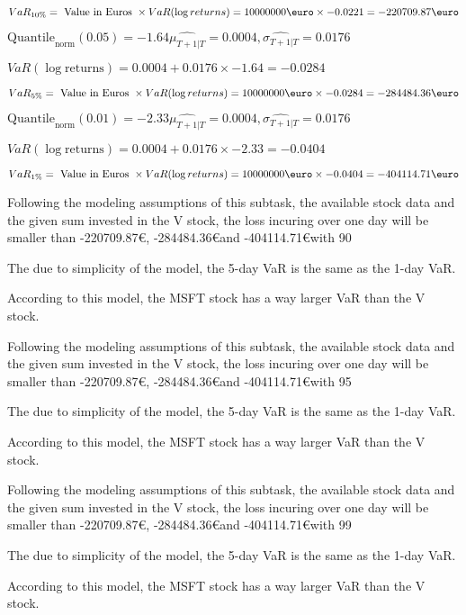 $VaR_{10\%} = \text{ Value in Euros } \times VaR(\log returns) = 10000000 \text{\euro} \times-0.0221 = -220709.87 \text{\euro}$


$\text{Quantile}_\text{norm}(0.05) = -1.64
         \hat{\mu_{T+1|T}} = 0.0004, \hat{\sigma_{T+1|T}} = 0.0176$

$VaR(\log \text{returns}) = 0.0004 + 0.0176\times-1.64 = -0.0284$

$VaR_{5\%} = \text{ Value in Euros } \times VaR(\log returns) = 10000000 \text{\euro} \times-0.0284 = -284484.36 \text{\euro}$


$\text{Quantile}_\text{norm}(0.01) = -2.33
         \hat{\mu_{T+1|T}} = 0.0004, \hat{\sigma_{T+1|T}} = 0.0176$

$VaR(\log \text{returns}) = 0.0004 + 0.0176\times-2.33 = -0.0404$

$VaR_{1\%} = \text{ Value in Euros } \times VaR(\log returns) = 10000000 \text{\euro} \times-0.0404 = -404114.71 \text{\euro}$


Following the modeling assumptions of this subtask, the available stock data and the given sum invested in the V stock, the loss incuring over one day will be smaller than -220709.87\euro, -284484.36\euro and -404114.71\euro with 90%


The due to simplicity of the model, the 5-day VaR is the same as the 1-day VaR.


According to this model, the MSFT stock has a way larger VaR than the V stock.


Following the modeling assumptions of this subtask, the available stock data and the given sum invested in the V stock, the loss incuring over one day will be smaller than -220709.87\euro, -284484.36\euro and -404114.71\euro with 95%


The due to simplicity of the model, the 5-day VaR is the same as the 1-day VaR.


According to this model, the MSFT stock has a way larger VaR than the V stock.


Following the modeling assumptions of this subtask, the available stock data and the given sum invested in the V stock, the loss incuring over one day will be smaller than -220709.87\euro, -284484.36\euro and -404114.71\euro with 99%


The due to simplicity of the model, the 5-day VaR is the same as the 1-day VaR.


According to this model, the MSFT stock has a way larger VaR than the V stock.

